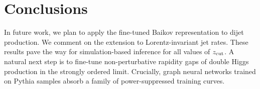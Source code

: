 \section{Conclusions}\label{sec:conclusions}

In future work, we plan to apply the fine-tuned Baikov representation to
dijet production. We comment on the extension to Lorentz-invariant jet
rates. These results pave the way for simulation-based inference for all
values of $z_{\rm cut}$. A natural next step is to fine-tune
non-perturbative rapidity gaps of double Higgs production in the
strongly ordered limit. Crucially, graph neural networks trained on
Pythia samples absorb a family of power-suppressed training curves.


